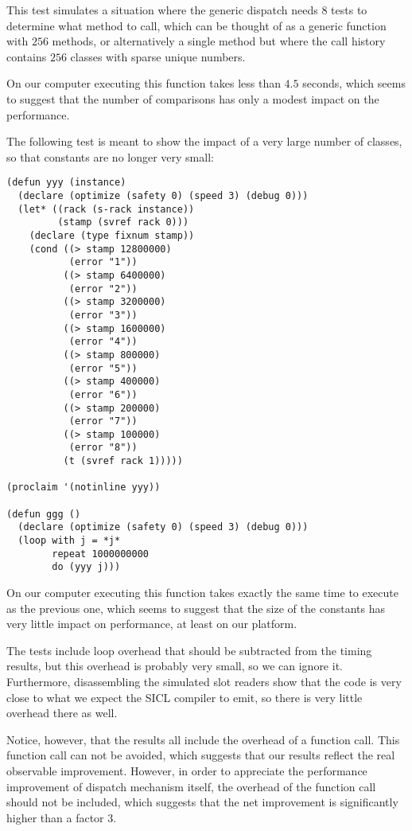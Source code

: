 This test simulates a situation where the generic dispatch needs $8$
tests to determine what method to call, which can be thought of as a
generic function with $256$ methods, or alternatively a single method
but where the call history contains $256$ classes with sparse unique
numbers. 

On our computer executing this function takes less than $4.5$ seconds,
which seems to suggest that the number of comparisons has only a
modest impact on the performance.  

The following test is meant to show the impact of a very large number
of classes, so that constants are no longer very small:

\begin{verbatim}
(defun yyy (instance)
  (declare (optimize (safety 0) (speed 3) (debug 0)))
  (let* ((rack (s-rack instance))
         (stamp (svref rack 0)))
    (declare (type fixnum stamp))
    (cond ((> stamp 12800000)
           (error "1"))
          ((> stamp 6400000)
           (error "2"))
          ((> stamp 3200000)
           (error "3"))
          ((> stamp 1600000)
           (error "4"))
          ((> stamp 800000)
           (error "5"))
          ((> stamp 400000)
           (error "6"))
          ((> stamp 200000)
           (error "7"))
          ((> stamp 100000)
           (error "8"))
          (t (svref rack 1)))))

(proclaim '(notinline yyy))

(defun ggg ()
  (declare (optimize (safety 0) (speed 3) (debug 0)))
  (loop with j = *j*
        repeat 1000000000
        do (yyy j)))
\end{verbatim}

On our computer executing this function takes exactly the same time to
execute as the previous one, which seems to suggest that the size of
the constants has very little impact on performance, at least on our
platform.

The tests include loop overhead that should be subtracted from the
timing results, but this overhead is probably very small, so we can
ignore it.  Furthermore, disassembling the simulated slot readers show
that the code is very close to what we expect the SICL compiler to
emit, so there is very little overhead there as well.  

Notice, however, that the results all include the overhead of a
function call.  This function call can not be avoided, which suggests
that our results reflect the real observable improvement.  However,
in order to appreciate the performance improvement of dispatch
mechanism itself, the overhead of the function call should not be
included, which suggests that the net improvement is significantly
higher than a factor $3$. 



